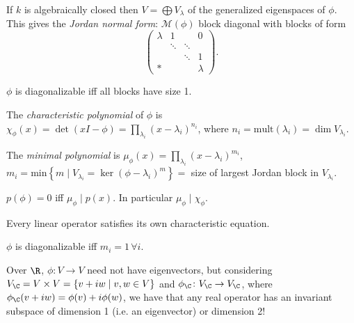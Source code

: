 \documentclass{notes}
\begin{document}
\begin{theorem}
    If $k$ is algebraically closed then $V=\bigoplus V_\lambda $ of the generalized eigenspaces of $\phi $. This gives the \emph{Jordan normal form}: $\mathcal{M} (\phi )$ block diagonal with blocks of form
    \[
        \begin{pmatrix} \lambda  & 1 & & 0 \\ & \ddots & \ddots & \\ &  & \ddots & 1 \\ *  & & & \lambda  \end{pmatrix} 
    .\]  
\end{theorem}

\begin{remark}
    $\phi $ is diagonalizable iff all blocks have size 1.
\end{remark}

\begin{defn}
    The \emph{characteristic polynomial} of $\phi $ is  $\chi_\phi (x)=\det(xI-\phi )=\prod_{\lambda _i} (x-\lambda _i)^{n_i}$, where $n_i=\text{mult}(\lambda _i) = \dim V_{\lambda _i}  $.

    The \emph{minimal polynomial} is $\mu _\phi (x)=\prod_{\lambda _i} {\left( x-\lambda _i \right) ^{m_i}} $, $m_i=\text{min}\left\{ m\mid  V_{\lambda _i}=\ker (\phi -\lambda _i)^m \right\} =$ size of largest Jordan block in $V_{\lambda _i}$.
\end{defn}

\begin{theorem}
    $p(\phi )=0$ iff $ \mu _\phi \mid  p(x)$. In particular $\mu _\phi \mid  \chi _\phi $.
\end{theorem}

\begin{corollary}
    Every linear operator satisfies its own characteristic equation.
\end{corollary}


\begin{remark}
    $\phi $ is diagonalizable iff $m_i=1\,\forall i$.
\end{remark}

\begin{theorem}
    Over $\R $, $\phi \colon V \to V $ need not have eigenvectors, but considering $V_{\C }=V\times V=\left\{ v+iw\mid  v,w\in V \right\} $ and $\phi _{\C }\colon V_{\C } \to V_{\C } $, where $\phi _{\C }(v+iw)=\phi (v)+i\phi (w)$, we have that any real operator has an invariant subspace of dimension 1 (i.e. an eigenvector) or dimension 2!
\end{theorem}
\end{document}
